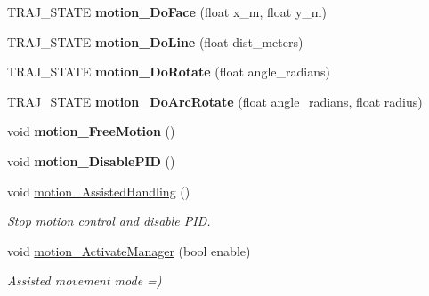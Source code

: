 \begin{DoxyCompactItemize}
\mbox{\label{classAsservDriver_a0e3dd8cd0074221327d049f522c35f1e}} 
T\+R\+A\+J\+\_\+\+S\+T\+A\+TE {\bfseries motion\+\_\+\+Do\+Face} (float x\+\_\+m, float y\+\_\+m)
\item 
\mbox{\label{classAsservDriver_a4ac101bd479baeecf76fd0d6be63421d}} 
T\+R\+A\+J\+\_\+\+S\+T\+A\+TE {\bfseries motion\+\_\+\+Do\+Line} (float dist\+\_\+meters)
\item 
\mbox{\label{classAsservDriver_aca1011c3fb10e594e836ea4ada6b92ff}} 
T\+R\+A\+J\+\_\+\+S\+T\+A\+TE {\bfseries motion\+\_\+\+Do\+Rotate} (float angle\+\_\+radians)
\item 
\mbox{\label{classAsservDriver_aabc36af66a38e2fb735e764730328994}} 
T\+R\+A\+J\+\_\+\+S\+T\+A\+TE {\bfseries motion\+\_\+\+Do\+Arc\+Rotate} (float angle\+\_\+radians, float radius)
\item 
\mbox{\label{classAsservDriver_aac603258c40d4c9aede0e5fce6ed4dea}} 
void {\bfseries motion\+\_\+\+Free\+Motion} ()
\item 
\mbox{\label{classAsservDriver_a0a68a702d1fea277c2e24e6dceb2d646}} 
void {\bfseries motion\+\_\+\+Disable\+P\+ID} ()
\item 
\mbox{\label{classAsservDriver_a733d0cddfdb612cea9e8097b348537f1}} 
void \hyperlink{classAsservDriver_a733d0cddfdb612cea9e8097b348537f1}{motion\+\_\+\+Assisted\+Handling} ()
\begin{DoxyCompactList}\small\item\em Stop motion control and disable P\+ID. \end{DoxyCompactList}\item 
\mbox{\label{classAsservDriver_aaeb3c80c8a079c812af38273f825c537}} 
void \hyperlink{classAsservDriver_aaeb3c80c8a079c812af38273f825c537}{motion\+\_\+\+Activate\+Manager} (bool enable)
\begin{DoxyCompactList}\small\item\em Assisted movement mode =) \end{DoxyCompactList}\item 
\mbox{\label{classAsservDriver_a179a024ddd900587e4da74521f9b7f1a}} 

\end{DoxyCompactItemize}
